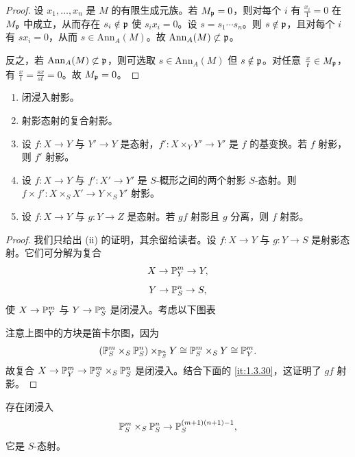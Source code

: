 \begin{proof}
设 $x_1,\dots,x_n$ 是 $M$ 的有限生成元族。若 $M_{\mathfrak{p}}=0$，则对每个 $i$ 有 $\frac{x_i}{1}=0$ 在 $M_{\mathfrak{p}}$ 中成立，从而存在 $s_i\notin \mathfrak{p}$ 使 $s_ix_i=0$。设 $s=s_1\cdots s_n$。则 $s\notin \mathfrak{p}$，且对每个 $i$ 有 $sx_i=0$，从而 $s\in \mathrm{Ann}_A(M)$。故 $\mathrm{Ann}_A(M)\not\subset \mathfrak{p}$。

反之，若 $\mathrm{Ann}_A(M)\not\subset \mathfrak{p}$，则可选取 $s\in \mathrm{Ann}_A(M)$ 但 $s\notin \mathfrak{p}$。对任意 $\frac{x}{t}\in M_{\mathfrak{p}}$，有 $\frac{x}{t}=\frac{sx}{st}=0$。故 $M_{\mathfrak{p}}=0$。
\end{proof}
\begin{proposition}\label{it:1.3.29}
\begin{enumerate}[label=(\roman*),leftmargin=2.8em]
  \item 闭浸入射影。
  \item 射影态射的复合射影。
  \item 设 $f\colon X\to Y$ 与 $Y'\to Y$ 是态射，$f'\colon X\times_Y Y'\to Y'$ 是 $f$ 的基变换。若 $f$ 射影，则 $f'$ 射影。
  \item 设 $f\colon X\to Y$ 与 $f'\colon X'\to Y'$ 是 $S$-概形之间的两个射影 $S$-态射。则 $f\times f'\colon X\times_S X'\to Y\times_S Y'$ 射影。
  \item 设 $f\colon X\to Y$ 与 $g\colon Y\to Z$ 是态射。若 $gf$ 射影且 $g$ 分离，则 $f$ 射影。
\end{enumerate}
\end{proposition}

\begin{proof}
我们只给出 (ii) 的证明，其余留给读者。设 $f\colon X\to Y$ 与 $g\colon Y\to S$ 是射影态射。它们可分解为复合
\[
X\to \mathbb{P}^m_Y\to Y,
\]
\[
Y\to \mathbb{P}^n_S\to S,
\]
使 $X\to \mathbb{P}^m_Y$ 与 $Y\to \mathbb{P}^n_S$ 是闭浸入。考虑以下图表
\begin{center}
\end{center}
注意上图中的方块是笛卡尔图，因为
\[
(\mathbb{P}^m_S\times_S\mathbb{P}^n_S)\times_{\mathbb{P}^n_S}Y\cong \mathbb{P}^m_S\times_S Y\cong \mathbb{P}^m_Y.
\]
故复合 $X\to \mathbb{P}^m_Y\to \mathbb{P}^m_S\times_S\mathbb{P}^n_S$ 是闭浸入。结合下面的 \ref{it:1.3.30}，这证明了 $gf$ 射影。
\end{proof}

\begin{lemma}\label{it:1.3.30}
存在闭浸入
\[
\mathbb{P}^m_S\times_S\mathbb{P}^n_S\to \mathbb{P}^{(m+1)(n+1)-1}_S,
\]
它是 $S$-态射。
\end{lemma}

